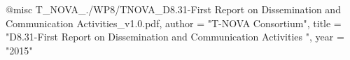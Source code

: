 @misc{ T_NOVA_./WP8/TNOVA_D8.31-First Report on Dissemination and Communication Activities_v1.0.pdf,
       author = "T-NOVA Consortium",
       title = "D8.31-First Report on Dissemination and Communication Activities ",
       year = "2015" }
